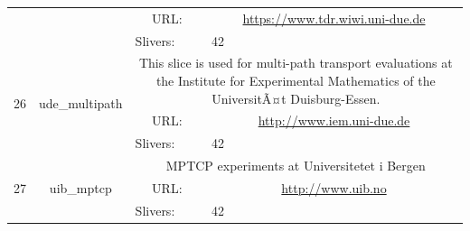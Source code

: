 \begin{small}
\begin{center}
\begin{longtable}{|c|c|c|c|}
  &  & \multicolumn{1}{|p{5em}|}{URL:} & \multicolumn{1}{|p{22.5em}|}{\url{https://www.tdr.wiwi.uni-due.de}} \\* \cline{3-3}\cline{4-4}
  &  & \multicolumn{1}{|l|}{Slivers:} & \multicolumn{1}{|l|}{42} \\ \hline
 \multirow{3}{*}{26} & \multirow{3}{*}{\index{ude\_multipath}\index{Slice!ude\_multipath}ude\_multipath} & \multicolumn{2}{|p{30em}|}{This slice is used for multi-path transport evaluations at the Institute for Experimental Mathematics of the UniversitÃ¤t Duisburg-Essen.} \\* \cline{3-3}\cline{4-4}
  &  & \multicolumn{1}{|p{5em}|}{URL:} & \multicolumn{1}{|p{22.5em}|}{\url{http://www.iem.uni-due.de}} \\* \cline{3-3}\cline{4-4}
  &  & \multicolumn{1}{|l|}{Slivers:} & \multicolumn{1}{|l|}{42} \\ \hline
 \multirow{3}{*}{27} & \multirow{3}{*}{\index{uib\_mptcp}\index{Slice!uib\_mptcp}uib\_mptcp} & \multicolumn{2}{|p{30em}|}{MPTCP experiments at Universitetet i Bergen} \\* \cline{3-3}\cline{4-4}
  &  & \multicolumn{1}{|p{5em}|}{URL:} & \multicolumn{1}{|p{22.5em}|}{\url{http://www.uib.no}} \\* \cline{3-3}\cline{4-4}
  &  & \multicolumn{1}{|l|}{Slivers:} & \multicolumn{1}{|l|}{42} \\ \hline
\end{longtable}
\end{center}
\end{small}
